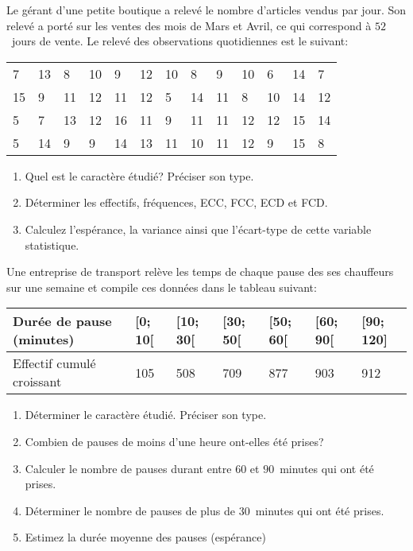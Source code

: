 \documentclass[a4paper, 11pt]{article}
\begin{document}
\exost Le g\'erant d'une petite boutique a relev\'e le nombre d'articles vendus par jour. Son relev\'e a porté sur les ventes des mois de Mars et Avril, ce qui correspond \`a $52$~jours de vente.
Le relev\'e des observations quotidiennes est le suivant:
  \begin{center}
    \begin{tabular}{lllllllllllll}
       7 & 13 & 8  & 10 & 9  & 12 & 10 & 8  & 9  & 10 & 6  & 14 & 7  \\
      15 & 9  & 11 & 12 & 11 & 12 & 5  & 14 & 11 & 8  & 10 & 14 & 12 \\
       5 & 7  & 13 & 12 & 16 & 11 & 9  & 11 & 11 & 12 & 12 & 15 & 14 \\
       5 & 14 & 9  & 9  & 14 & 13 & 11 & 10 & 11 & 12 & 9  & 15 & 8
    \end{tabular}
  \end{center}
  \begin{enumerate}
    \item Quel est le caract\`ere \'etudi\'e? Pr\'eciser son type.
    \item D\'eterminer les effectifs, fr\'equences, ECC, FCC, ECD et FCD.
    \item Calculez l'esp\'erance, la variance ainsi que l'\'ecart-type de cette variable statistique.
  \end{enumerate}
  
  \clearpage
\exost   Une entreprise de transport rel\`eve les temps de chaque pause des ses chauffeurs sur une semaine et compile ces données dans le tableau suivant:
  \begin{center}
    \begin{tabular}{|l|l|l|l|l|l|l|}
      \hline
      Durée de pause (minutes)  & [0; 10[ & [10; 30[ & [30; 50[ & [50; 60[ & [60; 90[ & [90; 120] \\
      \hline
      Effectif cumulé croissant &   105   &   508    &   709    &   877    &   903    &    912    \\
      \hline
    \end{tabular}
  \end{center}
  \begin{enumerate}
    \item D\'eterminer le caract\`ere \'etudi\'e. Pr\'eciser son type.
    \item Combien de pauses de moins d'une heure ont-elles \'et\'e prises?
    \item Calculer le nombre de pauses durant entre $60$ et $90$~minutes qui ont \'et\'e prises.
    \item D\'eterminer le nombre de pauses de plus de $30$~minutes qui ont \'et\'e prises.
    \item Estimez la dur\'ee moyenne des pauses (esp\'erance)
  \end{enumerate}
 
\end{document}
